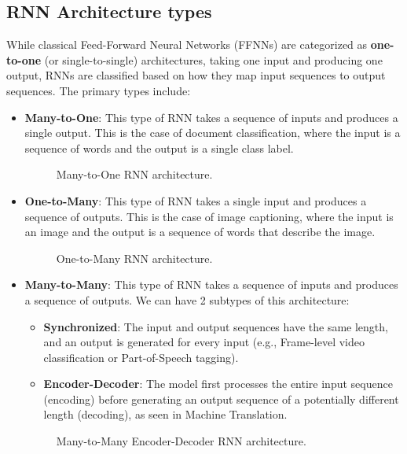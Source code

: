 \subsection{RNN Architecture types}
While classical Feed-Forward Neural Networks (FFNNs) are categorized as \textbf{one-to-one} (or single-to-single)
architectures, taking one input and producing one output, RNNs are classified based on how they map input sequences to output sequences.
The primary types include:
\begin{itemize}
    \item \textbf{Many-to-One}: This type of RNN takes a sequence of inputs and produces a single output.
    This is the case of document classification, where the input is a sequence of words and the output is a single class label.
    \begin{figure}[H]
        \centering
        
        \caption{Many-to-One RNN architecture.}
    \end{figure}

    \item \textbf{One-to-Many}: This type of RNN takes a single input and produces a sequence of outputs.
    This is the case of image captioning, where the input is an image and the output is a sequence of words that describe the image.
    \begin{figure}[H]
        \centering
        
        \caption{One-to-Many RNN architecture.}
    \end{figure}
    \item \textbf{Many-to-Many}: This type of RNN takes a sequence of inputs and produces a sequence of outputs.
    We can have 2 subtypes of this architecture:
    \begin{itemize}
        \item \textbf{Synchronized}: The input and output sequences have the same length, and an output is generated for every input
        (e.g., Frame-level video classification or Part-of-Speech tagging).
        \item \textbf{Encoder-Decoder}: The model first processes the entire input sequence (encoding) before generating an output sequence of a potentially different length (decoding),
        as seen in Machine Translation.
    \end{itemize}
    \begin{figure}[H]
        \centering
        \begin{minipage}{0.45\textwidth}
            \centering
            
            \caption{Many-to-Many Synchronized RNN architecture.}
        \end{minipage}
        \hfill
        \begin{minipage}{0.45\textwidth}
            \centering
            
            \caption{Many-to-Many Encoder-Decoder RNN architecture.}
        \end{minipage}
    \end{figure}
\end{itemize}

